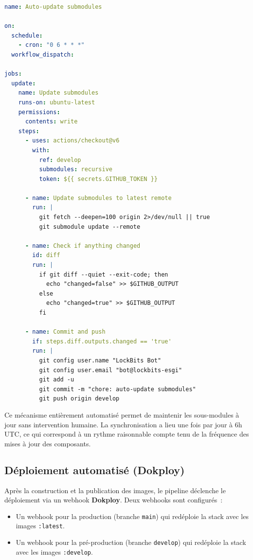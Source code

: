 \begin{lstlisting}[language=yaml, caption={Workflow de mise à jour automatique des submodules}, label={lst:auto-update-submodules}]
name: Auto-update submodules

on:
  schedule:
    - cron: "0 6 * * *"
  workflow_dispatch:

jobs:
  update:
    name: Update submodules
    runs-on: ubuntu-latest
    permissions:
      contents: write
    steps:
      - uses: actions/checkout@v6
        with:
          ref: develop
          submodules: recursive
          token: ${{ secrets.GITHUB_TOKEN }}

      - name: Update submodules to latest remote
        run: |
          git fetch --deepen=100 origin 2>/dev/null || true
          git submodule update --remote

      - name: Check if anything changed
        id: diff
        run: |
          if git diff --quiet --exit-code; then
            echo "changed=false" >> $GITHUB_OUTPUT
          else
            echo "changed=true" >> $GITHUB_OUTPUT
          fi

      - name: Commit and push
        if: steps.diff.outputs.changed == 'true'
        run: |
          git config user.name "LockBits Bot"
          git config user.email "bot@lockbits-esgi"
          git add -u
          git commit -m "chore: auto-update submodules"
          git push origin develop
\end{lstlisting}

Ce mécanisme entièrement automatisé permet de maintenir les sous-modules à jour
sans intervention humaine. La synchronisation a lieu une fois par jour à 6h
UTC, ce qui correspond à un rythme raisonnable compte tenu de la fréquence des
mises à jour des composants.

\subsection{Déploiement automatisé (Dokploy)}

Après la construction et la publication des images, le pipeline déclenche le
déploiement via un webhook \textbf{Dokploy}. Deux webhooks sont configurés~:

\begin{itemize}
  \item Un webhook pour la production (branche \texttt{main}) qui redéploie la
    stack avec les images \texttt{:latest}.
  \item Un webhook pour la pré-production (branche \texttt{develop}) qui
    redéploie la stack avec les images \texttt{:develop}.
\end{itemize}

